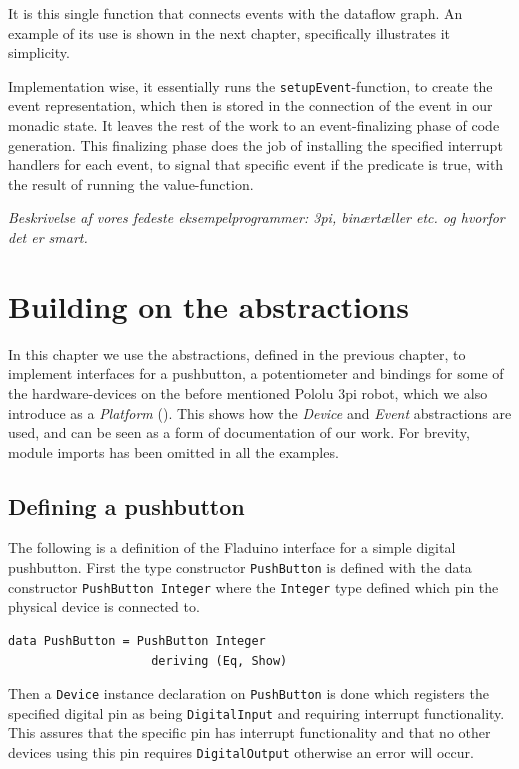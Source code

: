 \documentclass[a4paper, oneside, final]{memoir}
\let\fref\undefined
\begin{document}
\noindent
It is this single function that connects events with the dataflow
graph. An example of its use is shown in the next chapter,
specifically \fref{fig:onEvent usage} illustrates it simplicity.

Implementation wise, it essentially runs the
\verb|setupEvent|-function, to create the event representation, which
then is stored in the connection of the event in our monadic state.
It leaves the rest of the work to an event-finalizing phase of code
generation.  This finalizing phase does the job of installing the
specified interrupt handlers for each event, to signal that specific
event if the predicate is true, with the result of running the
value-function.




\textit{Beskrivelse af vores fedeste eksempelprogrammer: 3pi,
  binærtæller etc. og hvorfor det er smart.}

\chapter{Building on the abstractions}
\label{chap:example code}

In this chapter we use the abstractions, defined in the previous
chapter, to implement interfaces for a pushbutton, a potentiometer and
bindings for some of the hardware-devices on the before mentioned
Pololu 3pi robot, which we also introduce as a \textit{Platform}
(\fref[plain]{sec:platforms}). This shows how the \textit{Device} and
\textit{Event} abstractions are used, and can be seen as a form of
documentation of our work. For brevity, module imports has been
omitted in all the examples.

\section{Defining a pushbutton}
\label{sec:pushbuttondef}
The following is a definition of the Fladuino interface for a simple digital
pushbutton. First the type constructor \texttt{PushButton} is defined with the
data constructor \texttt{PushButton Integer} where the \texttt{Integer} type
defined which pin the physical device is connected to.

\begin{verbatim}
data PushButton = PushButton Integer
                    deriving (Eq, Show)
\end{verbatim}

\noindent
Then a \texttt{Device} instance declaration on \texttt{PushButton} is done which
registers the specified digital pin as being \texttt{DigitalInput} and requiring
interrupt functionality. This assures that the specific pin has interrupt
functionality and that no other devices using this pin requires
\texttt{DigitalOutput} otherwise an error will occur.
\end{document}
